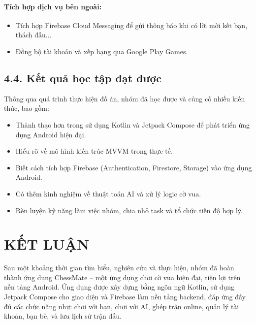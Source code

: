 \documentclass[a4paper,12pt]{article}
\begin{document}
\paragraph{\textbf{Tích hợp dịch vụ bên ngoài:}} %
\begin{itemize}[label=·]
    \item Tích hợp Firebase Cloud Messaging để gửi thông báo khi có lời mời kết bạn, thách đấu...
    \item Đồng bộ tài khoản và xếp hạng qua Google Play Games.
\end{itemize}

\subsection*{4.4. Kết quả học tập đạt được} %

\justify
\noindent Thông qua quá trình thực hiện đồ án, nhóm đã học được và củng cố nhiều kiến thức, bao gồm:
\begin{itemize}[label=·]
    \item Thành thạo hơn trong sử dụng Kotlin và Jetpack Compose để phát triển ứng dụng Android hiện đại.
    \item Hiểu rõ về mô hình kiến trúc MVVM trong thực tế.
    \item Biết cách tích hợp Firebase (Authentication, Firestore, Storage) vào ứng dụng Android.
    \item Có thêm kinh nghiệm về thuật toán AI và xử lý logic cờ vua.
    \item Rèn luyện kỹ năng làm việc nhóm, chia nhỏ task và tổ chức tiến độ hợp lý.
\end{itemize}

\newpage

\section*{\centering \textbf{KẾT LUẬN}} %

\justify
\noindent Sau một khoảng thời gian tìm hiểu, nghiên cứu và thực hiện, nhóm đã hoàn thành ứng dụng ChessMate – một ứng dụng chơi cờ vua hiện đại, tiện lợi trên nền tảng Android. Ứng dụng được xây dựng bằng ngôn ngữ Kotlin, sử dụng Jetpack Compose cho giao diện và Firebase làm nền tảng backend, đáp ứng đầy đủ các chức năng như: chơi với bạn, chơi với AI, ghép trận online, quản lý tài khoản, bạn bè, và lưu lịch sử trận đấu.
\end{document}
